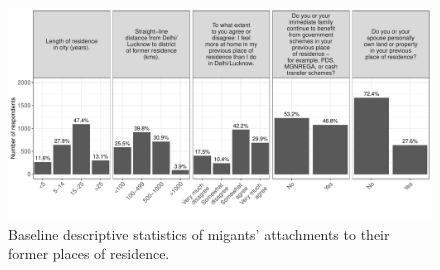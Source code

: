 \documentclass[
  11.5pt,
]{article}
\author{}
\date{\vspace{-2.5em}}
\begin{document}
\clearpage

\setcounter{page}{0}
\setcounter{page}{1}

\part*{}

\begin{figure}
\centering
\includegraphics{supplementary-information_files/figure-latex/fig-1-1.pdf}
\caption{Baseline descriptive statistics of migants' attachments to
their former places of residence.}
\end{figure}

\clearpage
\end{document}
